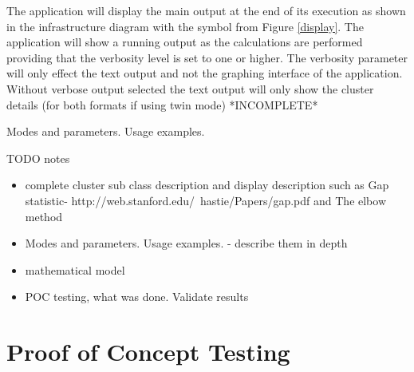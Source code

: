 The application will display the main output at the end of its execution as shown in the infrastructure diagram with the symbol from Figure \ref{display}. The application will show a running output as the calculations are performed providing that the verbosity level is set to one or higher. The verbosity parameter will only effect the text output and not the graphing interface of the application. Without verbose output selected the text output will only show the cluster details (for both formats if using twin mode)  *INCOMPLETE*

Modes and parameters. Usage examples.


\newpage
TODO notes
\begin{itemize}
\item complete cluster sub class description and display description such as Gap statistic- http://web.stanford.edu/~hastie/Papers/gap.pdf and The elbow method
\item Modes and parameters. Usage examples. - describe them in depth
\item mathematical model
\item POC testing, what was done. Validate results
\end{itemize}



\section{Proof of Concept Testing}
\label{poc}



